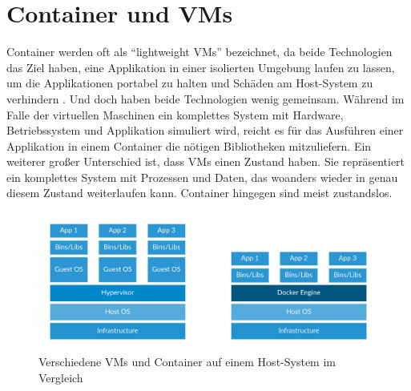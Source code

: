 \chapter{Container und VMs}

Container werden oft als “lightweight VMs” bezeichnet, da beide Technologien das Ziel haben, eine Applikation in einer isolierten Umgebung laufen zu lassen, um die Applikationen portabel zu halten und Schäden am Host-System zu verhindern \cite{docker:cvsvm}.
Und doch haben beide Technologien wenig gemeinsam. Während im Falle der virtuellen Maschinen ein komplettes System mit Hardware, Betriebssystem und Applikation simuliert wird, reicht es für das Ausführen einer Applikation in einem Container die nötigen Bibliotheken mitzuliefern.
Ein weiterer großer Unterschied ist, dass VMs einen Zustand haben. Sie repräsentiert ein komplettes System mit Prozessen und Daten, das woanders wieder in genau diesem Zustand weiterlaufen kann. Container hingegen sind meist zustandslos.\\

\begin{figure}[!ht]
  \centering
  \includegraphics[width=1\textwidth]{images/6-container-vm.png}
  \caption{Verschiedene VMs und Container auf einem Host-System im Vergleich \cite{docker}}
\end{figure}

